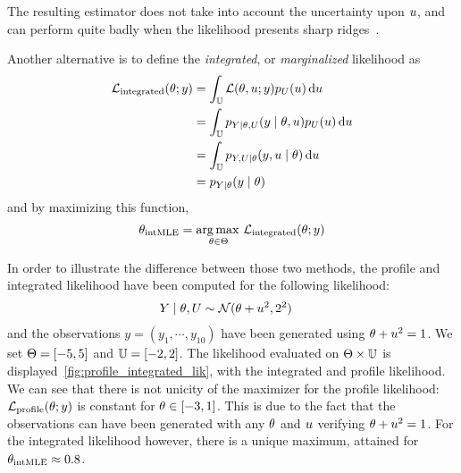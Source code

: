 \documentclass[../../Main_ManuscritThese.tex]{subfiles}
\begin{document}
The resulting estimator does not take into account the uncertainty upon $u$, and can perform quite badly when the likelihood presents sharp ridges~\cite{berger_integrated_1999}.

Another alternative is to define the \emph{integrated}, or \emph{marginalized} likelihood as
\begin{align}
  \mathcal{L}_{\mathrm{integrated}}(\theta;y) &= \int_{\mathbb{U}} \mathcal{L}(\theta,u;y) p_{U}(u) \,\mathrm{d}u \label{eq:def_int_lik}\\
                                              &=\int_{\mathbb{U}} p_{Y|\theta,U}(y \mid \theta,u) p_{U}(u) \,\mathrm{d}u \\
                                              &=\int_{\mathbb{U}} p_{Y,U|\theta}(y,u \mid \theta)\,\mathrm{d}u \\
  &= p_{Y \mid \theta}(y \mid \theta)
\end{align}
and by maximizing this function,
\begin{equation}
  {\theta}_{\mathrm{intMLE}} = \operatorname*{arg\,max \,}_{\theta\in\Theta}   \mathcal{L}_{\mathrm{integrated}}(\theta;y)
\end{equation}


\begin{example}
  \label{ex:profile_int_lik}
In order to illustrate the difference between those two methods, the profile and integrated likelihood have been computed for the following likelihood:
\begin{align}
  Y \mid \theta, U &\sim \mathcal{N}(\theta + u^2, 2^2)
\end{align}
and the observations $y = (y_1,\cdots, y_{10})$ have been generated using $\theta+u^2=1$. We set $\Theta = [-5,5]$ and $\mathbb{U} = [-2, 2]$. The likelihood evaluated on $\Theta \times \mathbb{U}$ is displayed~\cref{fig:profile_integrated_lik}, with the integrated and profile likelihood.
We can see that there is not unicity of the maximizer for the profile likelihood: $\mathcal{L}_{\mathrm{profile}}(\theta;y)$ is constant for $\theta \in [-3, 1]$. This is due to the fact that the observations can have been generated with any $\theta$ and $u$ verifying $\theta + u^2=1$.
For the integrated likelihood however, there is a unique maximum, attained for ${\theta}_{\mathrm{intMLE}} \approx 0.8$. 
\end{example}

\end{document}
